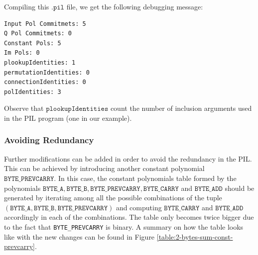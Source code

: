 Compiling this $\mathtt{.pil}$ file, we get the following debugging message:
\begin{lstlisting}
Input Pol Commitmets: 5
Q Pol Commitmets: 0
Constant Pols: 5
Im Pols: 0
plookupIdentities: 1
permutationIdentities: 0
connectionIdentities: 0
polIdentities: 3
\end{lstlisting}

Observe that $\mathtt{plookupIdentities}$ count the number of inclusion arguments used in the PIL program (one in our example). 

\subsubsection{Avoiding Redundancy}

Further modifications can be added in order to avoid the redundancy in the PIL. This can be achieved by introducing another constant polynomial $\mathtt{BYTE\_PREVCARRY}$. In this case, the constant polynomials table formed by the polynomials $\mathtt{BYTE\_A}, \mathtt{BYTE\_B}, \mathtt{BYTE\_PREVCARRY}, \mathtt{BYTE\_CARRY}$ and $\mathtt{BYTE\_ADD}$ should be generated by iterating among all the possible combinations of the tuple $(\mathtt{BYTE\_A}, \mathtt{BYTE\_B}, \mathtt{BYTE\_PREVCARRY})$ and computing $\mathtt{BYTE\_CARRY}$ and $\mathtt{BYTE\_ADD}$ accordingly in each of the combinations. The table only becomes twice bigger due to the fact that \texttt{BYTE\_PREVCARRY} is binary. A summary on how the table looks like with the new changes can be found in Figure \ref{table:2-bytes-sum-const-prevcarry}. 

